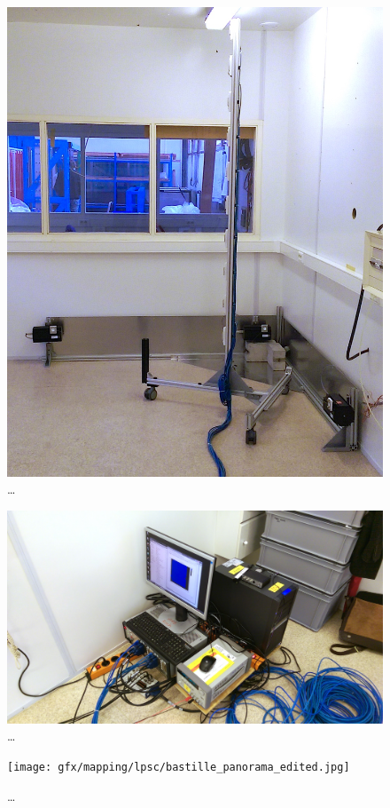 \begin{figure}
  \centering
  \includegraphics[width=0.9\linewidth]{gfx/mapping/lpsc/setup_edited.jpg}
  \caption{\ldots}
  \label{fig:mapping_bastille_setup}
\end{figure}

\begin{figure}
  \centering
  \includegraphics[width=0.9\linewidth]{gfx/mapping/lpsc/daq_edited.jpg}
  \caption{\ldots}
  \label{fig:mapping_bastille_daq}
\end{figure}

\begin{figure}
  \centering
  \texttt{[image: gfx/mapping/lpsc/bastille\_panorama\_edited.jpg]}
  \caption{\ldots}
  \label{fig:mapping_bastille_panorama}
\end{figure}

